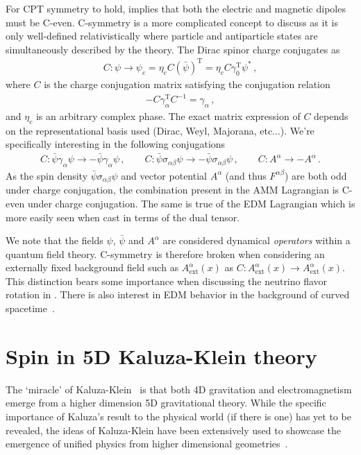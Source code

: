 For CPT symmetry to hold,  implies that both the electric and magnetic dipoles must be C-even. C-symmetry is a more complicated concept to discuss as it is only well-defined relativistically where particle and antiparticle states are simultaneously described by the theory. The Dirac spinor charge conjugates as
\begin{align}
    \label{c:1}
    C:\psi\rightarrow\psi_{c}=\eta_{c}C(\bar\psi)^\mathrm{T}= \eta_{c}C\gamma_{0}^\mathrm{T}\psi^{*}\,,
\end{align}
where $C$ is the charge conjugation matrix satisfying the conjugation relation
\begin{align}
    \label{c:2}
    -C\gamma_{\alpha}^\mathrm{T}C^{-1}=\gamma_{\alpha}\,,
\end{align}
and $\eta_{c}$ is an arbitrary complex phase. The exact matrix expression of $C$ depends on the representational basis used (Dirac, Weyl, Majorana, etc...). We're specifically interesting in the following conjugations
\begin{align}
    \label{c:3}
    C:\bar\psi\gamma_{\alpha}\psi\rightarrow-\bar\psi\gamma_{\alpha}\psi\,,\qquad
    C:\bar\psi\sigma_{\alpha\beta}\psi\rightarrow-\bar\psi\sigma_{\alpha\beta}\psi\,,\qquad
    C:A^{\alpha}\rightarrow-A^{\alpha}\,.
\end{align}
As the spin density $\bar\psi\sigma_{\alpha\beta}\psi$ and vector potential $A^{\alpha}$ (and thus $F^{\alpha\beta}$) are both odd under charge conjugation, the combination present in the AMM Lagrangian  is C-even under charge conjugation. The same is true of the EDM Lagrangian  which is more easily seen when cast in terms of the dual tensor.

We note that the fields $\psi$, $\bar\psi$ and $A^{\alpha}$ are considered dynamical \emph{operators} within a quantum field theory. C-symmetry is therefore broken when considering an externally fixed background field such as $A_\mathrm{ext}^{\alpha}(x)$ as $C:A_\mathrm{ext}^{\alpha}(x)\rightarrow A_\mathrm{ext}^{\alpha}(x)$. This distinction bears some importance when discussing the neutrino flavor rotation in . There is also interest in EDM behavior in the background of curved spacetime~\citep{Filho:2023lqe}.

\section{Spin in 5D Kaluza-Klein theory}
\label{sec:kk}
The `miracle' of Kaluza-Klein~\citep{Kaluza:1921tu,Klein:1926tv} is that both 4D gravitation and electromagnetism emerge from a higher dimension 5D gravitational theory. While the specific importance of Kaluza's result to the physical world (if there is one) has yet to be revealed, the ideas of Kaluza-Klein have been extensively used to showcase the emergence of unified physics from higher dimensional geometries~\citep{Ortin:2015hya}.

